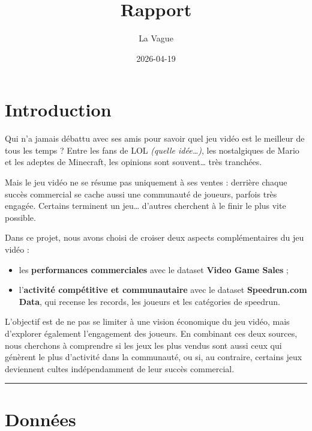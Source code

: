 \documentclass[
]{article}
\title{Rapport}
\author{La Vague}
\date{2026-04-19}
\providecommand{\tightlist}{%
  \setlength{\itemsep}{0pt}\setlength{\parskip}{0pt}}
\begin{document}
\maketitle

{
\setcounter{tocdepth}{2}
\tableofcontents
}
\newpage

\section{Introduction}\label{introduction}

Qui n'a jamais débattu avec ses amis pour savoir quel jeu vidéo est le
meilleur de tous les temps ? Entre les fans de LOL \emph{(quelle
idée\ldots)}, les nostalgiques de Mario et les adeptes de Minecraft, les
opinions sont souvent\ldots{} très tranchées.

Mais le jeu vidéo ne se résume pas uniquement à ses ventes : derrière
chaque succès commercial se cache aussi une communauté de joueurs,
parfois très engagée. Certains terminent un jeu\ldots{} d'autres
cherchent à le finir le plus vite possible.

Dans ce projet, nous avons choisi de croiser deux aspects
complémentaires du jeu vidéo :

\begin{itemize}
\tightlist
\item
  les \textbf{performances commerciales} avec le dataset \textbf{Video
  Game Sales} ;
\item
  l'\textbf{activité compétitive et communautaire} avec le dataset
  \textbf{Speedrun.com Data}, qui recense les records, les joueurs et
  les catégories de speedrun.
\end{itemize}

L'objectif est de ne pas se limiter à une vision économique du jeu
vidéo, mais d'explorer également l'engagement des joueurs. En combinant
ces deux sources, nous cherchons à comprendre si les jeux les plus
vendus sont aussi ceux qui génèrent le plus d'activité dans la
communauté, ou si, au contraire, certains jeux deviennent cultes
indépendamment de leur succès commercial.

\begin{center}\rule{0.5\linewidth}{0.5pt}\end{center}

\section{Données}\label{donnuxe9es}
\end{document}
